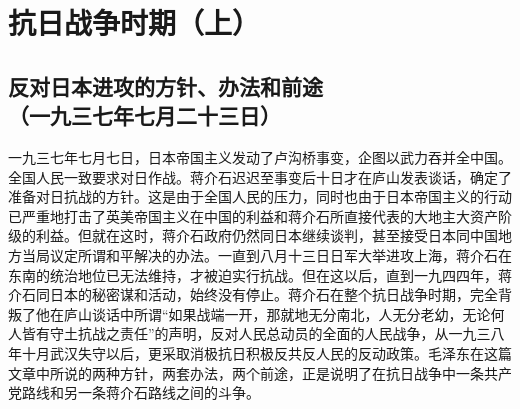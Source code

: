 \documentclass[cn,11pt,chinese]{elegantbook}
\def\myformat#1{\hfil\hfil #1}
\begin{document}
\chapter*{抗日战争时期（上）}\newpage\section*{\myformat{反对日本进攻的方针、办法和前途}\\\myformat{（一九三七年七月二十三日）}}
\begin{introduction}\item  一九三七年七月七日，日本帝国主义发动了卢沟桥事变，企图以武力吞并全中国。全国人民一致要求对日作战。蒋介石迟迟至事变后十日才在庐山发表谈话，确定了准备对日抗战的方针。这是由于全国人民的压力，同时也由于日本帝国主义的行动已严重地打击了英美帝国主义在中国的利益和蒋介石所直接代表的大地主大资产阶级的利益。但就在这时，蒋介石政府仍然同日本继续谈判，甚至接受日本同中国地方当局议定所谓和平解决的办法。一直到八月十三日日军大举进攻上海，蒋介石在东南的统治地位已无法维持，才被迫实行抗战。但在这以后，直到一九四四年，蒋介石同日本的秘密谋和活动，始终没有停止。蒋介石在整个抗日战争时期，完全背叛了他在庐山谈话中所谓“如果战端一开，那就地无分南北，人无分老幼，无论何人皆有守土抗战之责任”的声明，反对人民总动员的全面的人民战争，从一九三八年十月武汉失守以后，更采取消极抗日积极反共反人民的反动政策。毛泽东在这篇文章中所说的两种方针，两套办法，两个前途，正是说明了在抗日战争中一条共产党路线和另一条蒋介石路线之间的斗争。\end{introduction}
\end{document}
